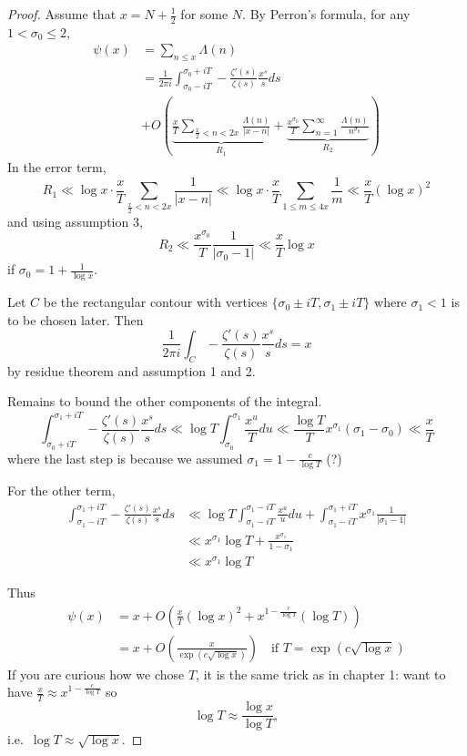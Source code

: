 \documentclass[a4paper]{article}
\theoremstyle{definition}
\begin{document}
\begin{proof}
  Assume that \(x = N + \frac{1}{2}\) for some \(N\). By Perron's formula, for any \(1 < \sigma_0 \leq 2\),
  \begin{align*}
    \psi(x)
    &= \sum_{n \leq x} \Lambda(n) \\
    &= \frac{1}{2\pi i} \int_{\sigma_0 - iT}^{\sigma_0 + iT} - \frac{\zeta'(s)}{\zeta(s)} \frac{x^s}{s} ds \\
    &+ O(\underbrace{\frac{x}{T} \sum_{\frac{x}{2} < n < 2x} \frac{\Lambda(n)}{|x - n|}}_{R_1} + \underbrace{\frac{x^{\sigma_0}}{T} \sum_{n = 1}^\infty \frac{\Lambda(n)}{n^{\sigma_0}}}_{R_2})
  \end{align*}
  In the error term,
  \[
    R_1
    \ll \log x \cdot \frac{x}{T} \sum_{\frac{x}{2} < n < 2x} \frac{1}{|x - n|}
    \ll \log x \cdot \frac{x}{T} \sum_{1 \leq m \leq 4x} \frac{1}{m}
    \ll \frac{x}{T} (\log x)^2
  \]
  and using assumption 3,
  \[
    R_2
    \ll \frac{x^{\sigma_0}}{T} \frac{1}{|\sigma_0 - 1|}
    \ll \frac{x}{T} \log x
  \]
  if \(\sigma_0 = 1 + \frac{1}{\log x}\).

  Let \(C\) be the rectangular contour with vertices \(\{\sigma_0 \pm iT, \sigma_1 \pm iT\}\) where \(\sigma_1 < 1\) is to be chosen later. Then
  \[
    \frac{1}{2\pi i} \int_C - \frac{\zeta'(s)}{\zeta(s)} \frac{x^s}{s} ds = x
  \]
  by residue theorem and assumption 1 and 2.

  Remains to bound the other components of the integral.
  \[
    \int_{\sigma_0 + iT}^{\sigma_1 + iT} - \frac{\zeta'(s)}{\zeta(s)} \frac{x^s}{s} ds
    \ll \log T \int_{\sigma_0}^{\sigma_1} \frac{x^u}{T} du
    \ll \frac{\log T}{T} x^{\sigma_1} (\sigma_1 - \sigma_0) \ll \frac{x}{T}
  \]
  where the last step is because we assumed \(\sigma_1 = 1 - \frac{c}{\log T}\) (?)

  For the other term,
  \begin{align*}
    \int_{\sigma_1 - iT}^{\sigma_1 + iT} - \frac{\zeta'(s)}{\zeta(s)} \frac{x^s}{s} ds
    &\ll \log T \int_{\sigma_1 - iT}^{\sigma_1 - iT} \frac{x^u}{u} du + \int_{\sigma_1 - iT}^{\sigma_1 + iT} x^{\sigma_1} \frac{1}{|\sigma_1 - 1|} \\
    &\ll x^{\sigma_1} \log T + \frac{x^{\sigma_1}}{1 - \sigma_1} \\
    &\ll x^{\sigma_1} \log T
  \end{align*}

  Thus
  \begin{align*}
    \psi(x)
    &= x + O(\frac{x}{T} (\log x)^2 + x^{1 - \frac{c}{\log T}} (\log T)) \\
    &= x + O(\frac{x}{\exp(c \sqrt{\log x})}) \quad \text{if } T = \exp(c \sqrt{\log x})
  \end{align*}
  If you are curious how we chose \(T\), it is the same trick as in chapter 1: want to have \(\frac{x}{T} \approx x^{1 - \frac{c}{\log T}}\) so
    \[
      \log T \approx \frac{\log x}{\log T},
    \]
    i.e.\ \(\log T \approx \sqrt{\log x}\).
\end{proof}
\end{document}
